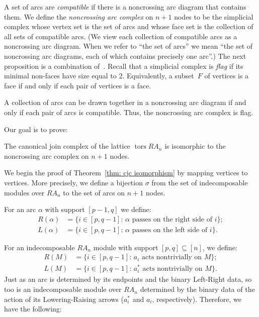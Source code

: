 \documentclass[ALCO,ThmDefs,Unicode,epreuves]{cedram}
\DeclareMathOperator{\tors}{tors}
\renewcommand{\1}{\hat{1}}
\newcommand{\0}{\hat{0}}
\newcommand{\newword}[1]{\emph{#1}}
\begin{document}
A set of arcs are \newword{compatible} if there is a noncrossing arc diagram that contains them.
We define the \newword{noncrossing arc complex} on $n+1$ nodes to be the simplicial complex whose vertex set is the set of arcs and whose face set is the collection of all sets of compatible arcs.
(We view each collection of compatible arcs as a noncrossing arc diagram.
When we refer to ``the set of arcs'' we mean ``the set of noncrossing arc diagrams, each of which contains precisely one arc''.)
The next proposition is a combination of~\cite[Proposition~3.2 and Corollary~3.6]{arcs}.
Recall that a simplicial complex is \newword{flag} if its minimal non-faces have size equal to 2.
Equivalently, a subset~$F$ of vertices is a face if and only if each pair of vertices is a face.
\begin{proposition}\label{arc flag}
A collection of arcs can be drawn together in a noncrossing arc diagram if and only if each pair of arcs is compatible.
Thus, the noncrossing arc complex is flag.
\end{proposition}

Our goal is to prove:

\begin{theorem}\label{thm: cjc isomorphism}
The canonical join complex of the lattice $\tors RA_n $ is isomorphic to the noncrossing arc complex on $n+1$ nodes.
\end{theorem}

We begin the proof of Theorem~\ref{thm: cjc isomorphism} by mapping vertices to vertices.
More precisely, we define a bijection $\sigma$ from the set of
indecomposable modules over $RA_n$ to the set of arcs on $n+1$ nodes.


For an arc $\alpha$ with support $[p-1,q]$ we define:
\begin{align*}
R(\alpha)&=\{i\in [p,q-1]:\, \text{$\alpha$ passes on the right side of $i$}\};\\
L(\alpha)&=\{i\in [p,q-1]:\, \text{$\alpha$ passes on the left side of $i$}\}.
\end{align*}

For an indecomposable $RA_n$ module with support $[p,q] \subseteq [n]$,
we define:
\begin{align*}
R(M)&=\{i\in [p,q-1]:\, \text{$a_{i}$ acts nontrivially on $M$}\};\\
L(M)&= \{i\in [p,q-1]:\, \text{$a_{i}^*$ acts nontrivially on $M$}\}.
\end{align*}
Just as an arc is determined by its endpoints and the binary Left-Right
data, so too is an indecomposable module over $RA_n$ determined by the
binary data of the action of its Lowering-Raising arrows ($a_i^*$ and
$a_i$, respectively). Therefore, we have the following:
\end{document}
